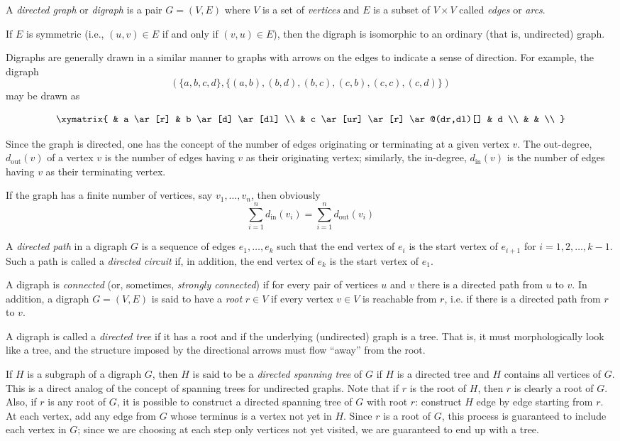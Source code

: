 \documentclass[12pt]{article}
\begin{document}
A \emph{directed graph} or \emph{digraph} is a pair $G=(V,E)$ where $V$ is a set of \emph{vertices} and $E$ is a subset of $V \times V$ called \emph{edges} or \emph{arcs}.

If $E$ is symmetric (i.e., $(u,v) \in E$ if and only if $(v,u) \in E$), then the digraph is isomorphic to an ordinary (that is, undirected) graph.

Digraphs are generally drawn in a similar manner to graphs with arrows on the edges to indicate a sense of direction.  For example, the digraph $$\left (\{a,b,c,d\}, \{(a,b),(b,d),(b,c),(c,b),(c,c),(c,d)\}\right )$$ may be drawn as

$$\xymatrix{
& a \ar[r] & b \ar[d] \ar[dl] \\
& c \ar[ur] \ar[r] \ar@(dr,dl)[] & d \\
& & \\
}$$

Since the graph is directed, one has the concept of the number of edges originating or terminating at a given vertex $v$. The out-degree, $d_{\textrm{out}}(v)$ of a vertex $v$ is the number of edges having $v$ as their originating vertex; similarly, the in-degree, $d_{\textrm{in}}(v)$ is the number of edges having $v$ as their terminating vertex.

If the graph has a finite number of vertices, say $v_1,\ldots,v_n$, then obviously
\[\sum_{i=1}^n d_{\textrm{in}}(v_i)=\sum_{i=1}^n d_{\textrm{out}}(v_i)\]

A \emph{directed path} in a digraph $G$ is a sequence of edges $e_1,\ldots,e_k$ such that the end vertex of $e_i$ is the start vertex of $e_{i+1}$ for $i=1,2,\ldots,k-1$. Such a path is called a \emph{directed circuit} if, in addition, the end vertex of $e_k$ is the start vertex of $e_1$.

A digraph is \emph{connected} (or, sometimes, \emph{strongly connected}) if for every pair of vertices $u$ and $v$ there is a directed path from $u$ to $v$. In addition, a digraph $G=(V,E)$ is said to have a \emph{root} $r\in V$ if every vertex $v\in V$ is reachable from $r$, i.e. if there is a directed path from $r$ to $v$.

A digraph is called a \emph{directed tree} if it has a root and if the underlying (undirected) graph is a tree. That is, it must morphologically look like a tree, and the structure imposed by the directional arrows must flow ``away'' from the root.

If $H$ is a subgraph of a digraph $G$, then $H$ is said to be a \emph{directed spanning tree} of $G$ if $H$ is a directed tree and $H$ contains all vertices of $G$. This is a direct analog of the concept of spanning trees for undirected graphs. Note that if $r$ is the root of $H$, then $r$ is clearly a root of $G$. Also, if $r$ is any root of $G$, it is possible to construct a directed spanning tree of $G$ with root $r$: construct $H$ edge by edge starting from $r$. At each vertex, add any edge from $G$ whose terminus is a vertex not yet in $H$. Since $r$ is a root of $G$, this process is guaranteed to include each vertex in $G$; since we are choosing at each step only vertices not yet visited, we are guaranteed to end up with a tree.
\end{document}
